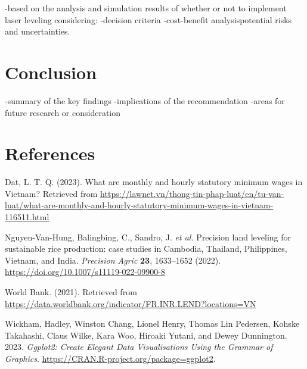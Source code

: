 \documentclass[
]{article}
\newlength{\cslhangindent}
\newlength{\cslentryspacingunit} %
\newenvironment{CSLReferences}[2] %
 {%
  \setlength{\parindent}{0pt}
  \ifodd #1
  \let\oldpar\par
  \def\par{\hangindent=\cslhangindent\oldpar}
  \fi
  \setlength{\parskip}{#2\cslentryspacingunit}
 }%
 {}
\begin{document}
-based on the analysis and simulation results of whether or not to
implement laser leveling considering: -decision criteria -cost-benefit
analysispotential risks and uncertainties.

\hypertarget{conclusion}{%
\section{Conclusion}\label{conclusion}}

-summary of the key findings -implications of the recommendation -areas
for future research or consideration

\hypertarget{references}{%
\section{References}\label{references}}

Dat, L. T. Q. (2023). What are monthly and hourly statutory minimum
wages in Vietnam? Retrieved from
\url{https://lawnet.vn/thong-tin-phap-luat/en/tu-van-luat/what-are-monthly-and-hourly-statutory-minimum-wages-in-vietnam-116511.html}

Nguyen-Van-Hung, Balingbing, C., Sandro, J. \emph{et al.} Precision land
leveling for sustainable rice production: case studies in Cambodia,
Thailand, Philippines, Vietnam, and India. \emph{Precision Agric}
\textbf{23}, 1633--1652 (2022).
\url{https://doi.org/10.1007/s11119-022-09900-8}

World Bank. (2021). Retrieved from
\url{https://data.worldbank.org/indicator/FR.INR.LEND?locations=VN}

\hypertarget{refs}{}
\begin{CSLReferences}{1}{0}
\leavevmode{}%
Wickham, Hadley, Winston Chang, Lionel Henry, Thomas Lin Pedersen,
Kohske Takahashi, Claus Wilke, Kara Woo, Hiroaki Yutani, and Dewey
Dunnington. 2023. \emph{Ggplot2: Create Elegant Data Visualisations
Using the Grammar of Graphics}.
\url{https://CRAN.R-project.org/package=ggplot2}.

\end{CSLReferences}
\end{document}
